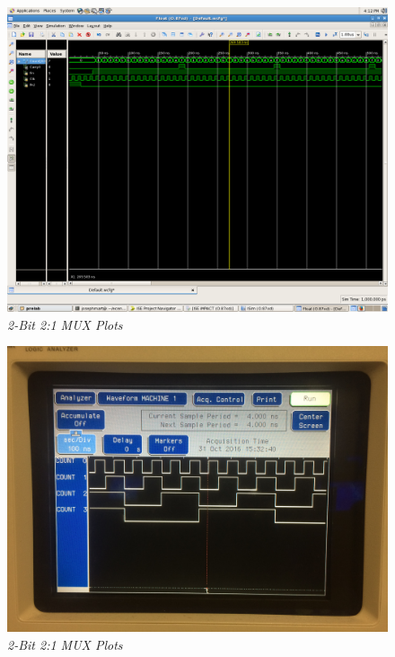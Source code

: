 \documentclass[a4paper,12pt]{article}
\begin{document}
\newpage
\begin{figure}[h]
  \begin{center}
    \includegraphics[scale=.1]{2_2_e.png}
    \caption{\textit{2-Bit 2:1 MUX Plots}}
  \end{center}
\end{figure}
\newpage
\begin{figure}[h]
  \begin{center}
    \includegraphics[scale=.1]{IMG_8620.JPG}
    \caption{\textit{2-Bit 2:1 MUX Plots}}
  \end{center}
\end{figure}
\newpage
\end{document}
